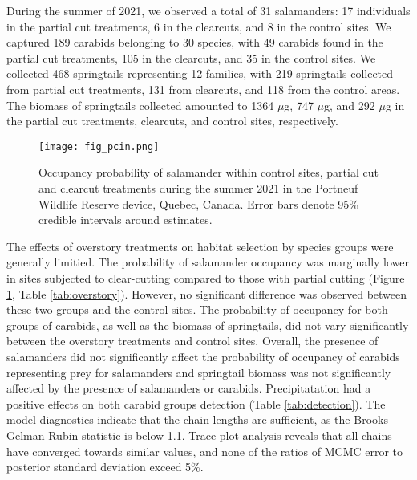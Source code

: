 During the summer of 2021, we observed a total of 31 salamanders: 17 individuals in the partial cut treatments, 6 in the clearcuts, and 8 in the control sites. We captured 189 carabids belonging to 30 species, with 49 carabids found in the partial cut treatments, 105 in the clearcuts, and 35 in the control sites. We collected 468 springtails representing 12 families, with 219 springtails collected from partial cut treatments, 131 from clearcuts, and 118 from the control areas. The biomass of springtails collected amounted to 1364 $\mu$g, 747 $\mu$g, and 292 $\mu$g in the partial cut treatments, clearcuts, and control sites, respectively.

\begin{figure}[ht]
  \centering
  \texttt{[image: fig\_pcin.png]}
  \caption[Occupancy probability of salamander under differentes overstory treatments]{Occupancy probability of salamander within control sites, partial cut and clearcut treatments during the summer 2021 in the Portneuf Wildlife Reserve device, Quebec, Canada. 
  Error bars denote 95\% credible intervals around estimates.}
  \label{fig:pcin}
\end{figure}

\vspace{0.5cm}

The effects of overstory treatments on habitat selection by species groups were generally limitied.
The probability of salamander occupancy was marginally lower in sites subjected to clear-cutting compared to those with partial cutting (Figure \ref{fig:pcin}, Table \ref{tab:overstory}). However, no significant difference was observed between these two groups and the control sites. 
The probability of occupancy for both groups of carabids, as well as the biomass of springtails, did not vary significantly between the overstory treatments and control sites. 
Overall, the presence of salamanders did not significantly affect the probability of occupancy of carabids representing prey for salamanders and springtail biomass was not significantly affected by the presence of salamanders or carabids.
Precipitatation had a positive effects on both carabid groups detection (Table \ref{tab:detection}). 
The model diagnostics indicate that the chain lengths are sufficient, as the Brooks-Gelman-Rubin statistic is below 1.1.
Trace plot analysis reveals that all chains have converged towards similar values, and none of the ratios of MCMC error to posterior standard deviation exceed 5\%.

\vspace{0.5cm}

